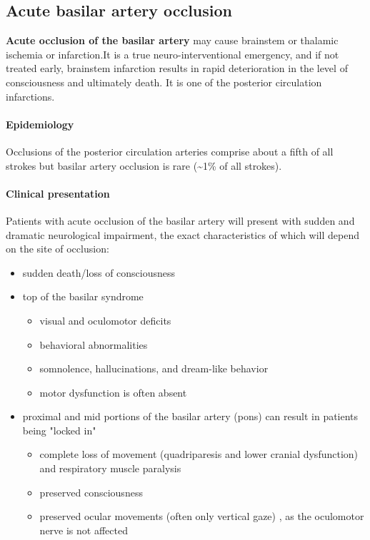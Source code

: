 \subsection{Acute basilar artery occlusion}

\textbf{Acute occlusion of the basilar artery} may cause brainstem or thalamic ischemia or infarction.It is a true neuro-interventional emergency, and if not treated early, brainstem infarction results in rapid deterioration in the level of consciousness and ultimately death. It is one of the posterior circulation infarctions.

\paragraph{Epidemiology}

Occlusions of the posterior circulation arteries comprise about a fifth of all strokes but basilar artery occlusion is rare (\textasciitilde1\% of all strokes).

\paragraph{Clinical presentation}

Patients with acute occlusion of the basilar artery will present with sudden and dramatic neurological impairment, the exact characteristics of which will depend on the site of occlusion:

\begin{itemize}
	\item
	sudden death/loss of consciousness
	\item
	top of the basilar syndrome
	
	\begin{itemize}
		\item
		visual and oculomotor deficits
		\item
		behavioral abnormalities
		\item
		somnolence, hallucinations, and dream-like behavior
		\item
		motor dysfunction is often absent
	\end{itemize}
	\item
	proximal and mid portions of the basilar artery (pons) can result in patients being "locked in" 
	
	\begin{itemize}
		\item
		complete loss of movement (quadriparesis and lower cranial dysfunction) and respiratory muscle paralysis
		\item
		preserved consciousness
		\item
		preserved ocular movements (often only vertical gaze) , as the oculomotor nerve is not affected
	\end{itemize}
\end{itemize}

